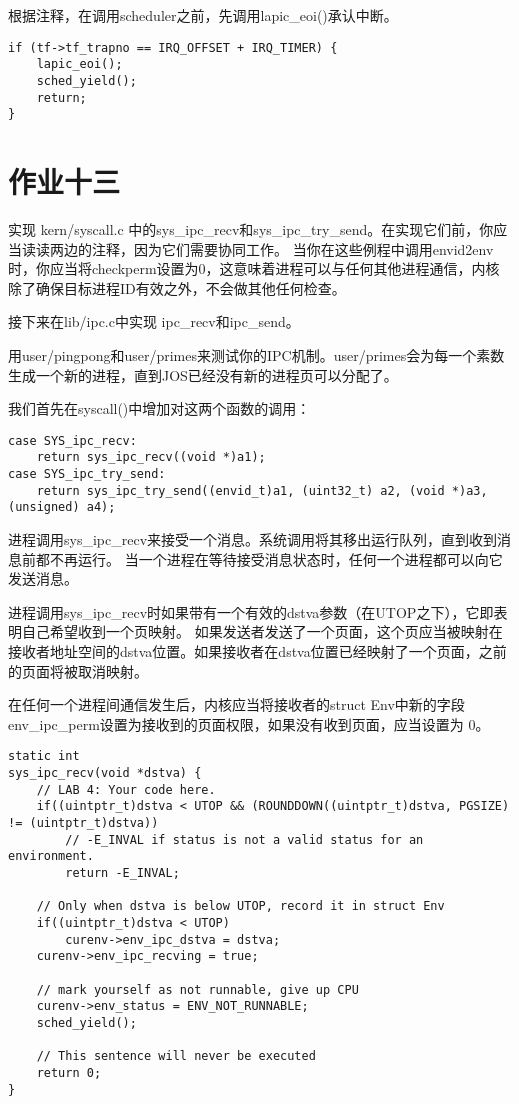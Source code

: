 \documentclass[12pt,a4paper]{article}
\begin{document}
根据注释，在调用scheduler之前，先调用lapic\_eoi()承认中断。
\begin{lstlisting}[style=CPP]
if (tf->tf_trapno == IRQ_OFFSET + IRQ_TIMER) {
    lapic_eoi();
    sched_yield();
    return;
}
\end{lstlisting}

\section{作业十三}

实现 kern/syscall.c 中的sys\_ipc\_recv和sys\_ipc\_try\_send。在实现它们前，你应当读读两边的注释，因为它们需要协同工作。
当你在这些例程中调用envid2env时，你应当将checkperm设置为0，这意味着进程可以与任何其他进程通信，内核除了确保目标进程ID有效之外，不会做其他任何检查。

接下来在lib/ipc.c中实现 ipc\_recv和ipc\_send。

用user/pingpong和user/primes来测试你的IPC机制。user/primes会为每一个素数生成一个新的进程，直到JOS已经没有新的进程页可以分配了。

我们首先在syscall()中增加对这两个函数的调用：
\begin{lstlisting}[style=CPP]
case SYS_ipc_recv:
    return sys_ipc_recv((void *)a1);
case SYS_ipc_try_send:
    return sys_ipc_try_send((envid_t)a1, (uint32_t) a2, (void *)a3, (unsigned) a4);
\end{lstlisting}

进程调用sys\_ipc\_recv来接受一个消息。系统调用将其移出运行队列，直到收到消息前都不再运行。
当一个进程在等待接受消息状态时，任何一个进程都可以向它发送消息。

进程调用sys\_ipc\_recv时如果带有一个有效的dstva参数（在UTOP之下），它即表明自己希望收到一个页映射。
如果发送者发送了一个页面，这个页应当被映射在接收者地址空间的dstva位置。如果接收者在dstva位置已经映射了一个页面，之前的页面将被取消映射。

在任何一个进程间通信发生后，内核应当将接收者的struct Env中新的字段env\_ipc\_perm设置为接收到的页面权限，如果没有收到页面，应当设置为 0。
\begin{lstlisting}[style=CPP]
static int
sys_ipc_recv(void *dstva) {
	// LAB 4: Your code here.
    if((uintptr_t)dstva < UTOP && (ROUNDDOWN((uintptr_t)dstva, PGSIZE) != (uintptr_t)dstva))
        // -E_INVAL if status is not a valid status for an environment.
        return -E_INVAL;

	// Only when dstva is below UTOP, record it in struct Env
	if((uintptr_t)dstva < UTOP)
		curenv->env_ipc_dstva = dstva;
    curenv->env_ipc_recving = true;

	// mark yourself as not runnable, give up CPU
	curenv->env_status = ENV_NOT_RUNNABLE;
    sched_yield();

    // This sentence will never be executed
	return 0;
}
\end{lstlisting}
\end{document}
